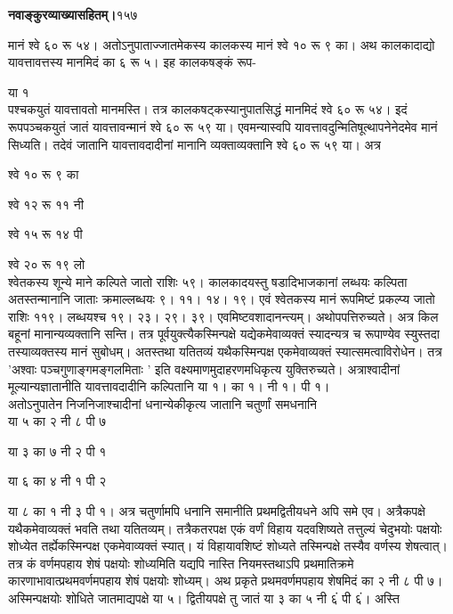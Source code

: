 \documentclass[11pt, openany]{book}
\begin{document}
\onehalfspacing
\hspace{2in}\textbf{नवाङ्कुरव्याख्यासहितम्।}\hspace{2in}१५७

\vspace{5mm}

\begin{sloppypar}
\hangindent=0.2in मानं श्वे ६० रू ५४। अतोऽनुपाताज्जातमेकस्य कालकस्य मानं श्वे १० रू ९ का। अथ कालकादाद्यो यावत्तावत्तस्य मानमिदं का ६ रू ५। इह कालकषङ्कं रूप-

\hspace{1.45in}या १\\

\hangindent=0.2in पश्चकयुतं यावत्तावतो मानमस्ति। तत्र कालकषट्कस्यानुपातसिद्धं मानमिदं श्वे ६० रू ५४। इदं रूपपञ्चकयुतं जातं यावत्तावन्मानं श्वे ६० रू ५९ या। एवमन्यास्वपि यावत्तावदुन्मितिषूत्थापनेनेदमेव मानं सिध्यति। तदेवं जातानि यावत्तावदादीनां मानानि व्यक्ताव्यक्तानि श्वे ६० रू ५९ या। अत्र 

\hspace{4.2in}श्वे १० रू ९ का

\hspace{4.2in}श्वे १२ रू ११ नी

\hspace{4.2in}श्वे १५ रू १४ पी

\hspace{4.2in}श्वे २० रू १९ लो\\

\hangindent=0.2in श्वेतकस्य शून्ये माने कल्पिते जातो राशिः ५९। कालकादयस्तु षडादिभाजकानां लब्धयः कल्पिता अतस्तन्मानानि जाताः क्रमाल्लब्धयः ९। ११। १४। १९। एवं श्वेतकस्य मानं रूपमिष्टं प्रकल्प्य जातो राशिः ११९। लब्धयश्च १९। २३। २९। ३९। एवमिष्टवशादानन्त्यम्। अथोपपत्तिरुच्यते। अत्र किल बहूनां मानान्यव्यक्तानि सन्ति। तत्र पूर्वयुक्त्यैकस्मिन्पक्षे यद्येकमेवाव्यक्तं स्यादन्यत्र च रूपाण्येव स्युस्तदा तस्याव्यक्तस्य मानं सुबोधम्। अतस्तथा यतितव्यं यथैकस्मिन्पक्ष एकमेवाव्यक्तं स्यात्समत्वाविरोधेन। तत्र 'अश्वाः पञ्चगुणाङ्गमङ्गलमिताः ' इति वक्ष्यमाणमुदाहरणमधिकृत्य युक्तिरुच्यते। अत्राश्वादीनां मूल्यान्यज्ञातानीति यावत्तावदादीनि कल्पितानि या १। का १। नी १। पी १।\\ अतोऽनुपातेन निजनिजाश्चादीनां धनान्येकीकृत्य जातानि चतुर्णां समधनानि\\ या ५ का २ नी ८ पी ७

या ३ का ७ नी २ पी १

या ६ का ४ नी १ पी २

\hangindent=0.2in या ८ का १ नी ३ पी १। अत्र चतुर्णामपि धनानि समानीति प्रथमद्वितीयधने अपि समे एव। अत्रैकपक्षे यथैकमेवाव्यक्तं भवति तथा यतितव्यम्। तत्रैकतरपक्ष एकं वर्णं विहाय यदवशिष्यते तत्तुल्यं चेदुभयोः पक्षयोः शोध्येत तर्ह्येकस्मिन्पक्ष एकमेवाव्यक्तं स्यात्। यं विहायावशिष्टं शोध्यते तस्मिन्पक्षे तस्यैव वर्णस्य शेषत्वात्। तत्र कं वर्णमपहाय शेषं पक्षयोः शोध्यमिति यद्यपि नास्ति नियमस्तथाऽपि प्रथमातिक्रमे कारणाभावात्प्रथमवर्णमपहाय शेषं पक्षयोः शोध्यम्। अथ प्रकृते प्रथमवर्णमपहाय शेषमिदं का २ नी ८ पी ७। अस्मिन्पक्षयोः शोधिते जातमाद्यपक्षे या ५। द्वितीयपक्षे तु जातं या ३ का ५ नी ६ं पी ६ं। अस्ति
\end{sloppypar}
\thispagestyle{empty}
\newpage
\end{document}
